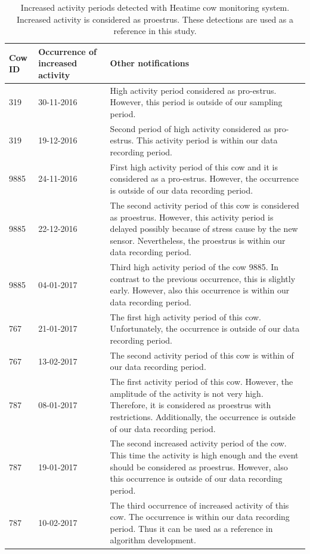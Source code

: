 \documentclass[english,12pt,a4paper,pdftex,elec,utf8]{aaltothesis}
\begin{document}
\begin{table} \caption{Increased activity periods detected with Heatime cow monitoring system. Increased activity is considered as proestrus. These detections are used as a reference in this study.}
\centering
\begin{tabular}{| p{1.25cm} | p{2.25cm} | p{8.8cm} |}
\hline
\textbf{Cow ID} & \textbf{Occurrence of increased activity} & \textbf{Other notifications} \\  \hline
319 & 30-11-2016 & High activity period considered as pro-estrus. However, this period is outside of our sampling period. \\ \hline
319 & 19-12-2016 &  Second period of high activity considered as pro-estrus. This activity period is within our data recording period.  \\ \hline
9885 & 24-11-2016 & First high activity period of this cow and it is considered as a pro-estrus. However, the occurrence is outside of our data recording period.  \\ \hline
9885  & 22-12-2016  & The second activity period of this cow is considered as proestrus. However, this activity period is delayed possibly because of stress cause by the new sensor. Nevertheless, the proestrus is within our data recording period.  \\ \hline
9885  & 04-01-2017  & Third high activity period of the cow 9885. In contrast to the previous occurrence, this is slightly early. However, also this occurrence is within our data recording period.  \\ \hline
 767 &  21-01-2017 & The first high activity period of this cow. Unfortunately, the occurrence is outside of our data recording period.  \\ \hline
 767 & 13-02-2017  & The second activity period of this cow is within of our data recording period.  \\ \hline
 787 & 08-01-2017 &  The first activity period of this cow. However, the amplitude of the activity is not very high. Therefore, it is considered as proestrus with restrictions. Additionally, the occurrence is outside of our data recording period. \\ \hline
 787 & 19-01-2017  & The second increased activity period of the cow. This time the activity is high enough and the event should be considered as proestrus. However, also this occurrence is outside of our data recording period.  \\ \hline
 787 & 10-02-2017  &  The third occurrence of increased activity of this cow. The occurrence is within our data recording period. Thus it can be used as a reference in algorithm development. \\ \hline
\end{tabular}
\end{table}
\end{document}
